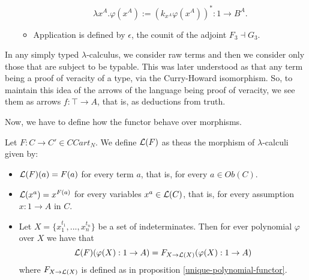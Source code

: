 \begin{definition}
\begin{itemize}
\begin{itemize}
      $$\lambda x^A.\varphi(x^A) := \left( k_{x^A}\varphi(x^A)\right)^*: 1 \to B^A.$$
    \item Application is defined by $\epsilon$, the counit of the adjoint $F_3\dashv G_3$.
    \end{itemize}
  \end{itemize}

\end{definition}


\begin{remark}
  In any simply typed $\lambda$-calculus, we consider raw terms and then we consider only those that are subject to be typable. This was later understood as that any term being a proof of veracity of a type, via the Curry-Howard isomorphism. So, to maintain this idea of the arrows of the language being proof of veracity, we see them as arrows $f:\top \to A$, that is, as deductions from truth. \\
\end{remark}

Now, we have to define how the functor behave over morphisms.

\begin{definition}
  Let $F:C\to C'\in CCart_N$. We define $\mathcal{L} (F)$ as theas the morphism of $\lambda$-calculi given by:
  \begin{itemize}
  \item $\mathcal{L} (F) (a)= F(a)$ for every term $a$, that is, for every $a\in Ob(C)$.
  \item $\mathcal{L} (x^a) = x^{F(a)}$ for every variables $x^a \in\mathcal{L}(C)$, that is, for every assumption $x: 1 \to A$ in $C$.
  \item Let $X= \{x_1^{t_1},...,x_n^{t_n}\}$ be a set of indeterminates. Then for ever polynomial $\varphi$ over $X$ we have that
    $$\mathcal{L}(F)(\varphi(X):1 \to A) = F_{X\to \mathcal{L}(X)}(\varphi(X):1 \to A)$$  where $F_{X\to \mathcal{L}(X)}$ is defined as in proposition \ref{unique-polynomial-functor}.
  \end{itemize}
\end{definition}

